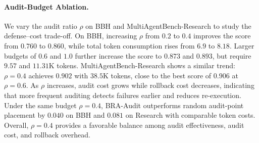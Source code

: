 \documentclass[letterpaper]{article} %
\begin{document}
\paragraph{Audit-Budget Ablation.}

We vary the audit ratio \(\rho\) on BBH and MultiAgentBench-Research to
study the defense--cost trade-off. On BBH, increasing \(\rho\) from
\(0.2\) to \(0.4\) improves the score from \(0.760\) to \(0.860\),
while total token consumption rises from \(6.9\) to \(8.18\).
Larger budgets of \(0.6\) and \(1.0\) further increase the score to
\(0.873\) and \(0.893\), but require \(9.57\) and \(11.31\)K
tokens. MultiAgentBench-Research shows a similar trend:
\(\rho=0.4\) achieves \(0.902\) with \(38.5\)K tokens, close to the
best score of \(0.906\) at \(\rho=0.6\). As \(\rho\) increases, audit
cost grows while rollback cost decreases, indicating that more frequent
auditing detects failures earlier and reduces re-execution. Under the
same budget \(\rho=0.4\), BRA-Audit outperforms random audit-point
placement by \(0.040\) on BBH and \(0.081\) on Research with comparable
token costs. Overall, \(\rho=0.4\) provides a favorable balance among
audit effectiveness, audit cost, and rollback overhead.


\end{document}
